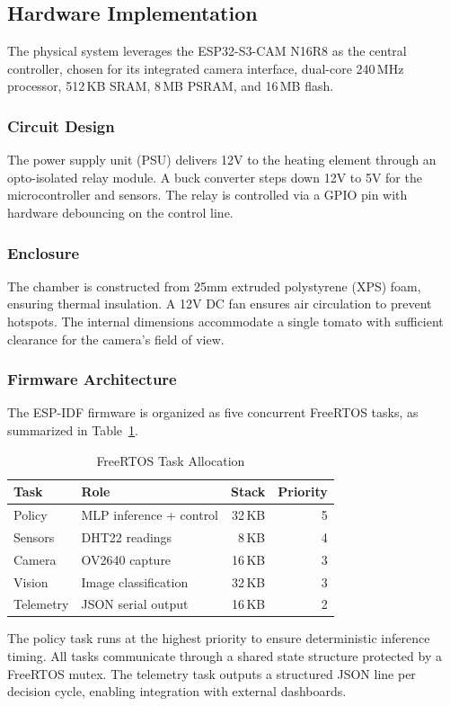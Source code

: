 \subsection{Hardware Implementation}
The physical system leverages the ESP32-S3-CAM N16R8 as the central controller, chosen for its integrated camera interface, dual-core 240\,MHz processor, 512\,KB SRAM, 8\,MB PSRAM, and 16\,MB flash.

\subsubsection{Circuit Design}
The power supply unit (PSU) delivers 12V to the heating element through an opto-isolated relay module. A buck converter steps down 12V to 5V for the microcontroller and sensors. The relay is controlled via a GPIO pin with hardware debouncing on the control line.

\subsubsection{Enclosure}
The chamber is constructed from 25mm extruded polystyrene (XPS) foam, ensuring thermal insulation. A 12V DC fan ensures air circulation to prevent hotspots. The internal dimensions accommodate a single tomato with sufficient clearance for the camera's field of view.

\subsubsection{Firmware Architecture}
The ESP-IDF firmware is organized as five concurrent FreeRTOS tasks, as summarized in Table~\ref{tab:freertos_tasks}.

\begin{table}[htbp]
\caption{FreeRTOS Task Allocation}
\label{tab:freertos_tasks}
\centering
\begin{tabular}{@{}llrr@{}}
\toprule
\textbf{Task} & \textbf{Role} & \textbf{Stack} & \textbf{Priority} \\
\midrule
Policy & MLP inference + control & 32\,KB & 5 \\
Sensors & DHT22 readings & 8\,KB & 4 \\
Camera & OV2640 capture & 16\,KB & 3 \\
Vision & Image classification & 32\,KB & 3 \\
Telemetry & JSON serial output & 16\,KB & 2 \\
\bottomrule
\end{tabular}
\end{table}

The policy task runs at the highest priority to ensure deterministic inference timing. All tasks communicate through a shared state structure protected by a FreeRTOS mutex. The telemetry task outputs a structured JSON line per decision cycle, enabling integration with external dashboards.
